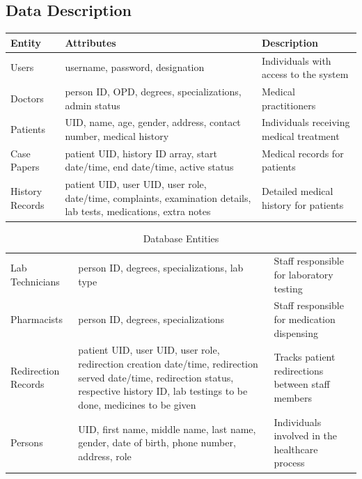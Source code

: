 \subsection{Data Description}
\begin{table}[h]
\centering
\begin{tabular}{|p{3cm}|p{4cm}|p{6cm}|}
\hline
\textbf{Entity} & \textbf{Attributes} & \textbf{Description} \\
\hline
Users & username, password, designation & Individuals with access to the system \\
Doctors & person ID, OPD, degrees, specializations, admin status & Medical practitioners \\
Patients & UID, name, age, gender, address, contact number, medical history & Individuals receiving medical treatment \\
Case Papers & patient UID, history ID array, start date/time, end date/time, active status & Medical records for patients \\
History Records & patient UID, user UID, user role, date/time, complaints, examination details, lab tests, medications, extra notes & Detailed medical history for patients \\
\hline
\end{tabular}
\end{table}
\begin{table}[h]
\centering
\begin{tabular}{|p{3cm}|p{4cm}|p{6cm}|}
\hline
Lab Technicians & person ID, degrees, specializations, lab type & Staff responsible for laboratory testing \\
Pharmacists & person ID, degrees, specializations & Staff responsible for medication dispensing \\
Redirection Records & patient UID, user UID, user role, redirection creation date/time, redirection served date/time, redirection status, respective history ID, lab testings to be done, medicines to be given & Tracks patient redirections between staff members \\
Persons & UID, first name, middle name, last name, gender, date of birth, phone number, address, role & Individuals involved in the healthcare process \\
\hline
\end{tabular}
\caption{Database Entities}
\end{table}
\clearpage

